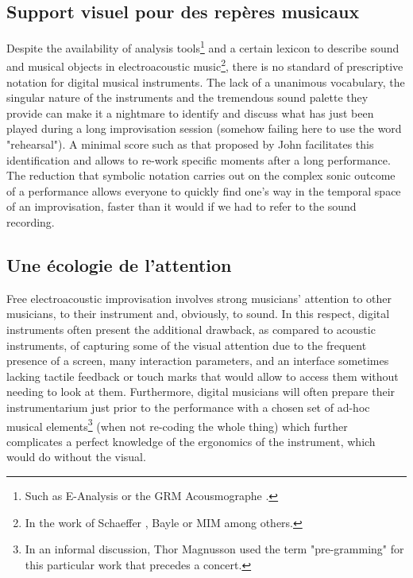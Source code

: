 \subsection{Support visuel pour des repères musicaux}

Despite the availability of analysis tools\footnote{Such as E-Analysis \cite{couprie_eanalysis:_2016} or the GRM Acousmographe \cite{favreau_lacousmographe_2010}.} and a certain lexicon to describe sound and musical objects in electroacoustic music\footnote{In the work of Schaeffer \cite{schaeffer_traite_1966}, Bayle \cite{bayle_musique_1993} or MIM \cite{delalande_les_1996} among others.}, there is no standard of prescriptive notation for digital musical instruments. The lack of a unanimous vocabulary, the singular nature of the instruments and the tremendous sound palette they provide can make it a nightmare to identify and discuss what has just been played during a long improvisation session (somehow failing here to use the word "rehearsal"). A minimal score such as that proposed by John facilitates this identification and allows to re-work specific moments after a long performance. The reduction that symbolic notation carries out on the complex sonic outcome of a performance allows everyone to quickly find one's way in the temporal space of an improvisation, faster than it would if we had to refer to the sound recording.

\subsection{Une écologie de l'attention}

Free electroacoustic improvisation involves strong musicians' attention to other musicians, to their instrument and, obviously, to sound. In this respect, digital instruments often present the additional drawback, as compared to acoustic instruments, of capturing some of the visual attention due to the frequent presence of a screen, many interaction parameters, and an interface sometimes lacking tactile feedback or touch marks that would allow to access them without needing to look at them. Furthermore, digital musicians will often prepare their instrumentarium just prior to the performance with a chosen set of ad-hoc musical elements\footnote{In an informal discussion, Thor Magnusson used the term "pre-gramming" for this particular work that precedes a concert.} (when not re-coding the whole thing) which further complicates a perfect knowledge of the ergonomics of the instrument, which would do without the visual.

